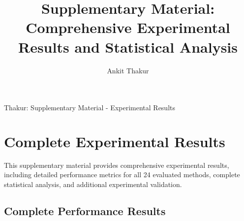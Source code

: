 \documentclass[journal]{IEEEtran}
\begin{document}
\title{Supplementary Material: Comprehensive Experimental Results and Statistical Analysis}

\author{Ankit Thakur}

%
{Thakur: Supplementary Material - Experimental Results}

\maketitle

\section{Complete Experimental Results}

This supplementary material provides comprehensive experimental results, including detailed performance metrics for all 24 evaluated methods, complete statistical analysis, and additional experimental validation.

\subsection{Complete Performance Results}
\end{document}
